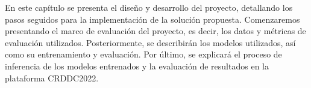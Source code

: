 En este capítulo se presenta el diseño y desarrollo del proyecto, detallando los pasos seguidos para la implementación de la solución propuesta. Comenzaremos presentando el marco de evaluación del proyecto, es decir, los datos y métricas de evaluación utilizados. Posteriormente, se describirán los modelos utilizados, así como su entrenamiento y evaluación. Por último, se explicará el proceso de inferencia de los modelos entrenados y la evaluación de resultados en la plataforma CRDDC2022.